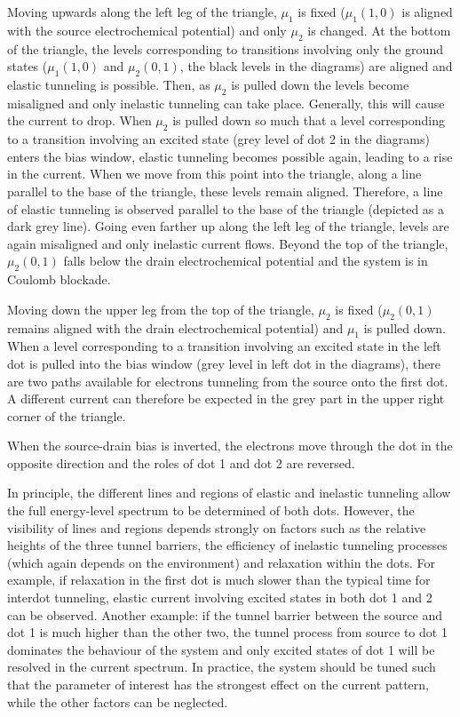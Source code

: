 \documentclass[12pt,aps,nofootinbib]{revtex4-1}
\begin{document}
Moving upwards along the left leg of the triangle, $\mu _{1}$ is
fixed ($\mu _{1}(1,0)$ is aligned with the source electrochemical
potential) and only $\mu _{2}$ is changed. At the bottom of the
triangle, the levels corresponding to transitions involving only
the ground states ($\mu _{1}(1,0)$ and $\mu _{2}(0,1)$, the black
levels in the diagrams) are aligned and elastic tunneling is
possible. Then, as $\mu _{2}$ is pulled down the levels become
misaligned and only inelastic tunneling can take place. Generally,
this will cause the current to drop. When $\mu _{2}$ is pulled
down so much that a level corresponding to a transition involving
an excited state (grey level of dot 2 in the diagrams) enters the
bias window, elastic tunneling becomes possible again, leading to
a rise in the current. When we move from this point into the
triangle, along a line parallel to the base of the triangle, these
levels remain aligned. Therefore, a line of elastic tunneling is
observed parallel to the base of the triangle (depicted as a dark
grey line). Going even farther up along the left leg of the
triangle, levels are again misaligned and only inelastic current
flows. Beyond the top of the triangle, $\mu _{2}(0,1)$ falls below
the drain electrochemical potential and the system is in Coulomb
blockade.

Moving down the upper leg from the top of the triangle, $\mu _{2}$
is fixed ($\mu _{2}(0,1)$ remains aligned with the drain
electrochemical potential) and $\mu _{1}$ is pulled down. When a
level corresponding to a transition involving an excited state in
the left dot is pulled into the bias window (grey level in left
dot in the diagrams), there are two paths available for electrons
tunneling from the source onto the first dot. A different current
can therefore be expected in the grey part in the upper right
corner of the triangle.

When the source-drain bias is inverted, the electrons move through
the dot in the opposite direction and the roles of dot 1 and dot 2 are
reversed.

In principle, the different lines and regions of elastic and
inelastic tunneling allow the full energy-level spectrum to be
determined of both dots. However, the visibility of lines and
regions depends strongly on factors such as the relative heights
of the three tunnel barriers, the efficiency of inelastic
tunneling processes (which again depends on the environment) and
relaxation within the dots. For example, if relaxation in the
first dot is much slower than the typical time for interdot
tunneling, elastic current involving excited states in both dot 1
and 2 can be observed. Another example: if the tunnel barrier
between the source and dot 1 is much higher than the other two, the
tunnel process from source to dot 1 dominates the behaviour of the
system and only excited states of dot 1 will be resolved in the
current spectrum. In practice, the system should be tuned such
that the parameter of interest has the strongest effect on the
current pattern, while the other factors can be neglected.
\end{document}
